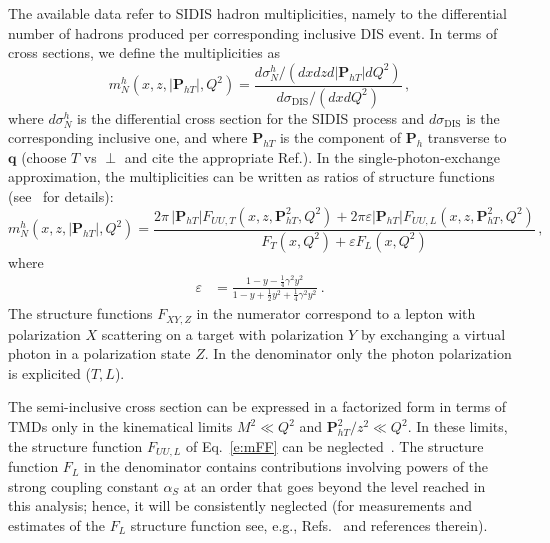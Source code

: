 \documentclass[aps,preprintnumbers,showpacs,nofootinbib,superscriptaddress,floatfix]{revtex4}
\newcommand{\AS}[1]{{\textcolor[rgb]{1,0,1}{#1}}}
\newcommand{\Tperp}{T}
\begin{document}
The available data refer to SIDIS hadron multiplicities, namely to the differential number of hadrons produced per corresponding inclusive DIS event. In terms of cross sections, we define the multiplicities as
\begin{equation}
m_N^h (x,z,|\bm{P}_{h\Tperp}|, Q^2) = \frac{d \sigma_N^h / ( dx  dz d|\bm{P}_{h\Tperp}| dQ^2) }
                                                                   {d\sigma_{\text{DIS}} / ( dx dQ^2 ) }\, ,
\label{e:multiplicity}
\end{equation}
where $d\sigma_N^h$ is the differential cross section for the SIDIS process and $d\sigma_{\text{DIS}}$ is the corresponding inclusive one, 
and where \( \bm{P}_{h\Tperp} \) is the component of \( \bm{P}_{h} \) transverse to \( \bm{q} \) \AS{(choose $T$ vs $\perp$ and cite the appropriate Ref.)}. 
In the single-photon-exchange approximation, the multiplicities can be written as ratios of
structure functions (see~\cite{Bacchetta:2006tn} for details):
\begin{equation}
m_N^h (x,z,|\bm{P}_{h\Tperp}|, Q^2) =   
\frac{2 \pi\,|\bm{P}_{h\Tperp}| F_{UU ,T}(x,z,\bm{P}_{h\Tperp}^2, Q^2) + 2 \pi
  \varepsilon |\bm{P}_{h\Tperp}| F_{UU ,L}(x,z,\bm{P}_{h\Tperp}^2, Q^2)}
        {F_{T}(x,Q^2) + \varepsilon  F_{L}(x,Q^2)} \, ,
 \label{e:mFF}
\end{equation} 
where
\begin{align}
\varepsilon &= \frac{1-y -\frac{1}{4} \gamma^2 y^2}{1-y+\frac{1}{2} y^2 +\frac{1}{4} \gamma^2 y^2} \ .
\end{align}  
\AS{The structure functions $F_{XY,Z}$ in the numerator correspond to a lepton with polarization $X$ scattering on a target with polarization $Y$ by exchanging a virtual photon in a polarization state $Z$. In the denominator only the photon polarization is explicited ($T, L$).}

The semi-inclusive cross section can be expressed in a factorized form in
terms of TMDs only in the kinematical limits $M^2 \ll Q^2$ and \AS{$\bm{P}_{hT}^2/z^2 \ll Q^2$}. 
In these limits, the structure function $F_{UU,L}$ of Eq.~\eqref{e:mFF}
can be neglected~\cite{Bacchetta:2008xw}. 
 The structure function $F_L$ in the denominator contains contributions
 involving powers of the strong coupling constant $\alpha_S$ at an order that
 goes beyond the level reached in this analysis; 
hence, it will be
 consistently neglected (for measurements and
 estimates of the $F_L$ structure function see, e.g.,
 Refs.~\cite{Chekanov:2009na,Andreev:2013vha} and references therein).  
\end{document}
